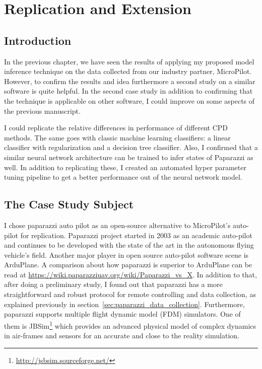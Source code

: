 \chapter{Replication and Extension}

\section{Introduction}

In the previous chapter, we have seen the results of applying my proposed model inference technique on the data collected from our industry partner, MicroPilot. However, to confirm the results and idea furthermore a second study on a similar software is quite helpful. In the second case study in addition to confirming that the technique is applicable on other software, I could improve on some aspects of the previous manuscript.

I could replicate the relative differences in performance of different CPD methods. The same goes with classic machine learning classifiers: a linear classifier with regularization and a decision tree classifier. 
Also, I confirmed that a similar neural network architecture can be trained to infer states of Paparazzi as well.
In addition to replicating these, I created an automated hyper parameter tuning pipeline to get a better performance out of the neural network model. 

\section{The Case Study Subject}
I chose paparazzi auto pilot as an open-source alternative to MicroPilot's auto-pilot for replication. Paparazzi \cite{hattenberger2014using} project started in 2003 as an academic auto-pilot and continues to be developed with the state of the art in the autonomous flying vehicle's field. Another major player in open source auto-pilot software scene is ArduPlane. A comparison about how paparazzi is superior to ArduPlane can be read at \url{https://wiki.paparazziuav.org/wiki/Paparazzi_vs_X}. 
In addition to that, after doing a preliminary study, I found out that paparazzi has a more straightforward and robust protocol for remote controlling and data collection, as explained previously in section~\ref{sec:paparazzi_data_collection}. 
Furthermore, paparazzi supports multiple flight dynamic model (FDM) simulators. One of them is JBSim\footnote{\url{http://jsbsim.sourceforge.net/}} which provides an advanced physical model of complex dynamics in air-frames and sensors for an accurate and close to the reality simulation. 


